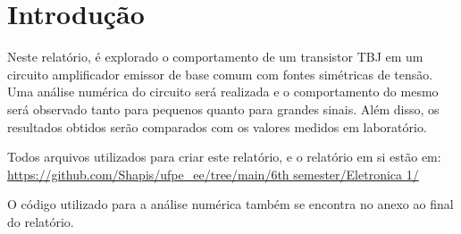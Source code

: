 \section{Introdução}

Neste relatório, é explorado o comportamento de um transistor TBJ em um circuito amplificador emissor de base comum com fontes simétricas de tensão. Uma análise numérica do circuito será realizada e o comportamento do mesmo será observado tanto para pequenos quanto para grandes sinais. Além disso, os resultados obtidos serão comparados com os valores medidos em laboratório.

Todos arquivos utilizados para criar este relatório, e o relatório em si estão em:  \url{https://github.com/Shapis/ufpe_ee/tree/main/6th semester/Eletronica 1/}

O código utilizado para a análise numérica também se encontra no anexo ao final do relatório.